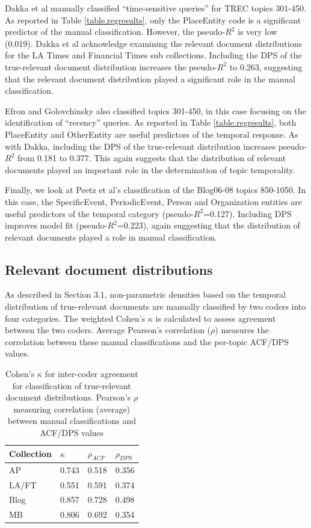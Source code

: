 \documentclass{sig-alternate-05-2015}
\begin{document}
Dakka et al manually classified ``time-sensitive queries'' for TREC topics 301-450. As reported in Table \ref{table.regresults}, only the PlaceEntity code is a significant predictor of the manual classification. However, the pseudo-$R^2$ is very low (0.019).  Dakka et al acknowledge examining the relevant document distributions for the LA Times and Financial Times sub collections.  Including the DPS of the true-relevant document distribution increases the pseudo-$R^2$ to 0.263, suggesting that the relevant document distribution played a significant role in the manual classification.

Efron and Golovchinsky also classified topics 301-450, in this case focusing on the identification of ``recency'' queries. As reported in Table \ref{table.regresults}, both PlaceEntity and OtherEntity are useful predictors of the temporal response. As with Dakka, including the DPS of the true-relevant distribution increases pseudo-$R^2$ from 0.181 to 0.377. This again suggests that the distribution of relevant documents played an important role in the determination of topic temporality.

Finally, we look at Peetz et al's classification of the Blog06-08 topics 850-1050. In this case, the SpecificEvent, PeriodicEvent, Person and Organization entities are useful predictors of the temporal category (pseudo-$R^2$=0.127). Including DPS  improves model fit (pseudo-$R^2$=0.223), again suggesting that the distribution of relevant documents played a role in manual classification.

\subsection{Relevant document distributions}

As described in Section 3.1, non-parametric densities based on the temporal distribution of true-relevant documents are manually classified by two coders into four categories.  The weighted Cohen's $\kappa$ is calculated to assess agreement between the two coders.  Average Pearson's correlation ($\rho$) measures the correlation between these manual classifications and the per-topic ACF/DPS values.  

\begin{table}
\scriptsize
\centering
\begin{tabular}{| l | l | l | l | } \hline
\bf{Collection} & \bf{$\kappa$}  & \bf{$\rho_{ACF}$} & \bf{$\rho_{DPS}$} \\ \hline
AP 	   & 0.743 & 0.518 & 0.356 \\ \hline
LA/FT & 0.551 & 0.591 & 0.374 \\ \hline
Blog    & 0.857 & 0.728 & 0.498 \\ \hline
MB      & 0.806 & 0.692 & 0.354 \\ \hline 
\end{tabular}
\caption{\small Cohen's $\kappa$ for inter-coder agreement for classification of true-relevant document distributions. Pearson's $\rho$ measuring correlation (average) between manual classifications and ACF/DPS values}
\vspace{-.75em}
\label{table.cor}
\end{table}
\end{document}
